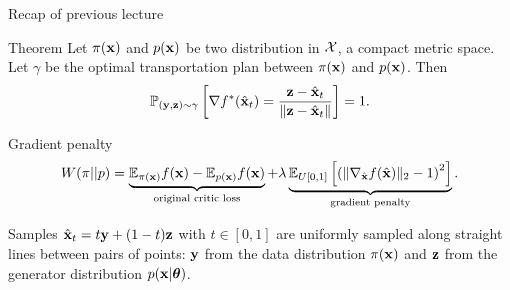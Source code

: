 

\begin{frame}
\titlepage
\end{frame}
\begin{frame}{Recap of previous lecture}
	\begin{block}{Theorem}
		Let $\pi(\mathbf{x})$ and $p(\mathbf{x})$ be two distribution in $\mathcal{X}$, a compact metric space. Let $\gamma$ be the optimal transportation plan between $\pi(\mathbf{x})$ and $p(\mathbf{x})$. Then
		\vspace{-0.4cm}
		\[
			\mathbb{P}_{(\mathbf{y}, \mathbf{z}) \sim \gamma} \left[ \nabla f^*(\hat{\mathbf{x}}_t) = \frac{\mathbf{z} - \hat{\mathbf{x}}_t}{\| \mathbf{z} - \hat{\mathbf{x}}_t \|} \right] = 1.
		\]
		\vspace{-0.6cm}
	\end{block}
	\begin{block}{Gradient penalty}
		\vspace{-0.5cm}
		\[
			W(\pi || p) = \underbrace{\mathbb{E}_{\pi(\mathbf{x})} f(\mathbf{x})  - \mathbb{E}_{p(\mathbf{x})} f(\mathbf{x})}_{\text{original critic loss}} + \lambda \underbrace{\mathbb{E}_{U[0, 1]} \left[ \left( \| \nabla_{\hat{\mathbf{x}}} f(\hat{\mathbf{x}}) \|_2 - 1 \right) ^ 2\right]}_{\text{gradient penalty}}.
		\]
		\vspace{-0.5cm}
	\end{block}
	Samples $\hat{\mathbf{x}}_t = t \mathbf{y} + (1 - t) \mathbf{z}$ with $t \in [0, 1]$ are uniformly sampled along straight lines between pairs of points: $\mathbf{y}$ from the data distribution $\pi(\mathbf{x})$ and $\mathbf{z}$ from the generator distribution $p(\mathbf{x} | \boldsymbol{\theta})$.
\end{frame}

